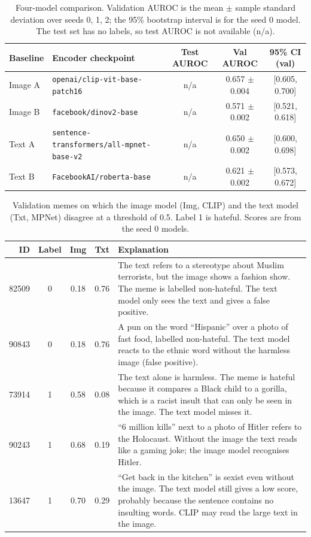 \documentclass[compactaffiliation]{Interspeech}
\begin{document}
\begin{table}[t]
\caption{Four-model comparison. Validation AUROC is the mean $\pm$ sample standard deviation over seeds 0, 1, 2;
the 95\% bootstrap interval is for the seed 0 model. The test set has no labels, so test AUROC is not available (n/a).}
\label{tab:results}
\centering\footnotesize
\begin{tabular}{llccc}
\toprule
Baseline & Encoder checkpoint & Test AUROC & Val AUROC & 95\% CI (val) \\
\midrule
Image A & \texttt{openai/clip-vit-base-patch16} & n/a & 0.657 $\pm$ 0.004 & [0.605, 0.700] \\
Image B & \texttt{facebook/dinov2-base} & n/a & 0.571 $\pm$ 0.002 & [0.521, 0.618] \\
Text A & \texttt{sentence-transformers/all-mpnet-base-v2} & n/a & 0.650 $\pm$ 0.002 & [0.600, 0.698] \\
Text B & \texttt{FacebookAI/roberta-base} & n/a & 0.621 $\pm$ 0.002 & [0.573, 0.672] \\
\bottomrule
\end{tabular}
\end{table}

\begin{table}[t]
\caption{Validation memes on which the image model (Img, CLIP) and the text model (Txt, MPNet)
disagree at a threshold of 0.5. Label 1 is hateful. Scores are from the seed 0 models.}
\label{tab:errors}
\centering\footnotesize
\begin{tabular}{rccc>{\raggedright\arraybackslash}p{12.4cm}}
\toprule
ID & Label & Img & Txt & Explanation \\
\midrule
82509 & 0 & 0.18 & 0.76 & The text refers to a stereotype about Muslim terrorists, but the image shows a fashion show. The meme is labelled non-hateful. The text model only sees the text and gives a false positive. \\
90843 & 0 & 0.18 & 0.76 & A pun on the word ``Hispanic'' over a photo of fast food, labelled non-hateful. The text model reacts to the ethnic word without the harmless image (false positive). \\
73914 & 1 & 0.58 & 0.08 & The text alone is harmless. The meme is hateful because it compares a Black child to a gorilla, which is a racist insult that can only be seen in the image. The text model misses it. \\
90243 & 1 & 0.68 & 0.19 & ``6 million kills'' next to a photo of Hitler refers to the Holocaust. Without the image the text reads like a gaming joke; the image model recognises Hitler. \\
13647 & 1 & 0.70 & 0.29 & ``Get back in the kitchen'' is sexist even without the image. The text model still gives a low score, probably because the sentence contains no insulting words. CLIP may read the large text in the image. \\
\bottomrule
\end{tabular}
\end{table}
\end{document}

